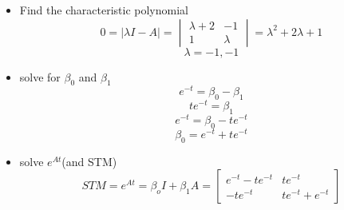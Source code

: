 \begin{enumerate}
\begin{itemize}
    \item Find the characteristic polynomial \\
      \begin{equation}
        0 = |\lambda I - A| =
        \begin{vmatrix}
          \lambda +2 & -1 \\
          1 & \lambda 
        \end{vmatrix} =
        \lambda^2 + 2\lambda + 1
      \end{equation}
      \begin{equation}
        \lambda = -1,-1
      \end{equation}
    \item solve for $\beta_0$ and $\beta_1$ \\
      \begin{equation}
        e^{-t} = \beta_0 - \beta_1
      \end{equation}
      \begin{equation}
        te^{-t} = \beta_1
      \end{equation}
      \begin{equation}
        e^{-t} = \beta_0 - te^{-t}
      \end{equation}
      \begin{equation}
        \beta_0 = e^{-t} + te^{-t}
      \end{equation}
    \item solve $e^{At}$(and STM)
      \begin{equation}
        STM = e^{At} = \beta_oI + \beta_1A =
        \begin{bmatrix}
          e^{-t} - te^{-t} & te^{-t}\\
          -te^{-t} & te^{-t} + e^{-t}
        \end{bmatrix}
      \end{equation}
    \end{itemize}
  \end{enumerate}